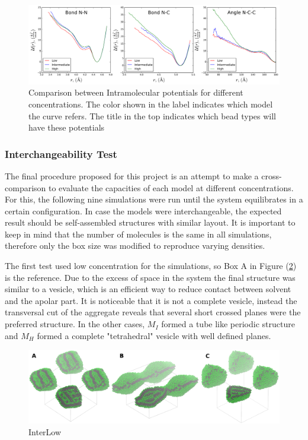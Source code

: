 \documentclass[10pt,a4paper,twoside]{article}
\begin{document}
\begin{figure}[H]
  \begin{center}
	\includegraphics[width=1 \textwidth]{./graphs/PotCompIntra}
	\caption{Comparison between Intramolecular potentials for different concentrations. The color shown in the label indicates which model the curve refers. The title in the top indicates which bead types will have these potentials}
	\label{Fig:PotCompIntra}
  \end{center}
\end{figure} 
  
	
\subsubsection{Interchangeability Test }

The final procedure proposed for this project is an attempt to make a cross-comparison to evaluate the capacities of each model at different concentrations. For this, the following nine simulations were run until the system equilibrates in a certain configuration. In case the models were interchangeable, the expected result should be self-assembled structures with similar layout. It is important to keep in mind  that the number of molecules is the same in all simulations, therefore only the box size was modified to reproduce varying densities.

 The first test used low concentration for the simulations, so Box A in Figure (\ref{Fig:InterLow}) is the reference. Due to the excess of space in the system the final structure was similar to  a vesicle, which is an efficient way to reduce contact between solvent and the apolar part. It is noticeable that it is not a complete vesicle, instead the transversal cut of the aggregate reveals that several short crossed planes were the preferred structure. In the other cases, $M_I$ formed a tube like periodic structure and $M_H$ formed a complete "tetrahedral" vesicle with well defined planes.

\begin{figure}[H]
  \begin{center}
	\includegraphics[width=1 \textwidth]{./images/InterLow}
	\caption{InterLow}
	\label{Fig:InterLow}
  \end{center}
\end{figure} 
\end{document}
